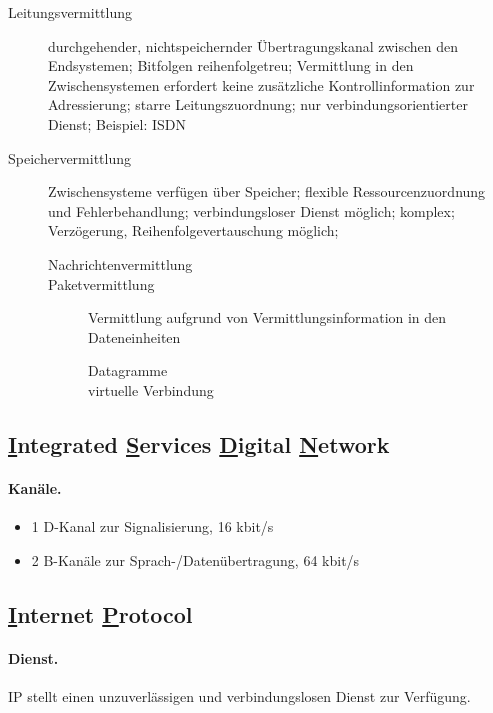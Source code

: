 \documentclass[]{scrartcl}
\begin{document}
\begin{description}
\item[Leitungsvermittlung] durchgehender, nichtspeichernder \"Ubertragungskanal zwischen den Endsystemen; Bitfolgen reihenfolgetreu; Vermittlung in den Zwischensystemen erfordert keine zus\"atzliche Kontrollinformation zur Adressierung; starre Leitungszuordnung; nur verbindungsorientierter Dienst; Beispiel: ISDN
\item[Speichervermittlung]  Zwischensysteme verf\"ugen \"uber Speicher; flexible Ressourcenzuordnung und Fehlerbehandlung; verbindungsloser Dienst m\"oglich; komplex; Verz\"ogerung, Reihenfolgevertauschung m\"oglich;
 \begin{description}
\item[Nachrichtenvermittlung]
\item[Paketvermittlung] Vermittlung aufgrund von Vermittlungsinformation in den Dateneinheiten
\begin{description}
\item[Datagramme]
\item[virtuelle Verbindung]
\end{description}

\end{description}

\end{description}

\subsection{\underline{I}ntegrated \underline{S}ervices \underline{D}igital \underline{N}etwork}

\paragraph{Kan\"ale.}
\begin{itemize}
\item 1 D-Kanal zur Signalisierung, 16 kbit/s
\item 2 B-Kan\"ale zur Sprach-/Daten\"ubertragung, 64 kbit/s
\end{itemize}


\subsection{\underline{I}nternet \underline{P}rotocol}

\paragraph{Dienst.} IP stellt einen unzuverl\"assigen und verbindungslosen Dienst zur Verf\"ugung.
\end{document}
